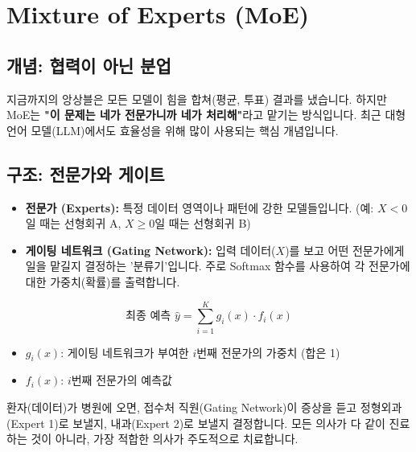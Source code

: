 \documentclass[11pt,a4paper]{book}
\theoremstyle{definition}
\begin{document}
\section{Mixture of Experts (MoE)}

\subsection{개념: 협력이 아닌 분업}
지금까지의 앙상블은 모든 모델이 힘을 합쳐(평균, 투표) 결과를 냈습니다. 하지만 MoE는 \textbf{"이 문제는 네가 전문가니까 네가 처리해"}라고 맡기는 방식입니다. 최근 대형 언어 모델(LLM)에서도 효율성을 위해 많이 사용되는 핵심 개념입니다.

\subsection{구조: 전문가와 게이트}
\begin{itemize}
    \item \textbf{전문가 (Experts):} 특정 데이터 영역이나 패턴에 강한 모델들입니다. (예: $X < 0$일 때는 선형회귀 A, $X \ge 0$일 때는 선형회귀 B)
    \item \textbf{게이팅 네트워크 (Gating Network):} 입력 데이터($X$)를 보고 어떤 전문가에게 일을 맡길지 결정하는 '분류기'입니다. 주로 Softmax 함수를 사용하여 각 전문가에 대한 가중치(확률)를 출력합니다.
\end{itemize}

\begin{equation}
\text{최종 예측 } \hat{y} = \sum_{i=1}^{K} g_i(x) \cdot f_i(x)
\end{equation}
\begin{itemize}
    \item $g_i(x)$: 게이팅 네트워크가 부여한 $i$번째 전문가의 가중치 (합은 1)
    \item $f_i(x)$: $i$번째 전문가의 예측값
\end{itemize}

\begin{analogybox}[title={병원 진료 시스템}]
환자(데이터)가 병원에 오면, 접수처 직원(Gating Network)이 증상을 듣고 정형외과(Expert 1)로 보낼지, 내과(Expert 2)로 보낼지 결정합니다. 모든 의사가 다 같이 진료하는 것이 아니라, 가장 적합한 의사가 주도적으로 치료합니다.
\end{analogybox}
\end{document}

